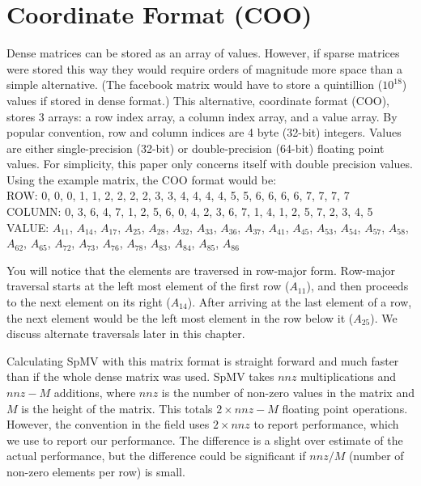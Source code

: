 \section{Coordinate Format (COO)}
\label{sec:coo}
\par Dense matrices can be stored as an array of values. However, if sparse matrices were stored this way they would require orders of magnitude more space than a simple alternative. (The facebook matrix would have to store a quintillion ($10^{18}$) values if stored in dense format.) This alternative, coordinate format (COO), stores 3 arrays: a row index array, a column index array, and a value array. By popular convention, row and column indices are 4 byte (32-bit) integers. Values are either single-precision (32-bit) or double-precision (64-bit) floating point values. For simplicity, this paper only concerns itself with double precision values. Using the example matrix, the COO format would be:\\
ROW:    0, 0, 0, 1, 1, 2, 2, 2, 2, 3, 3, 4, 4, 4, 4, 5, 5, 6, 6, 6, 6, 7, 7, 7, 7 \\ 
COLUMN: 0, 3, 6, 4, 7, 1, 2, 5, 6, 0, 4, 2, 3, 6, 7, 1, 4, 1, 2, 5, 7, 2, 3, 4, 5\\ 
VALUE: $A_{11}$, $A_{14}$, $A_{17}$, $A_{25}$, $A_{28}$, $A_{32}$, $A_{33}$, $A_{36}$, $A_{37}$, $A_{41}$, $A_{45}$, $A_{53}$, $A_{54}$, $A_{57}$, $A_{58}$, $A_{62}$, $A_{65}$, $A_{72}$, $A_{73}$, $A_{76}$, $A_{78}$, $A_{83}$, $A_{84}$, $A_{85}$, $A_{86}$ \par
You will notice that the elements are traversed in row-major form. Row-major traversal starts at the left most element of the first row ($A_{11}$), and then proceeds to the next element on its right ($A_{14}$). After arriving at the last element of a row, the next element would be the left most element in the row below it ($A_{25}$). We discuss alternate traversals later in this chapter.
\par Calculating SpMV with this matrix format is straight forward and much faster than if the whole dense matrix was used. SpMV takes $nnz$ multiplications and $nnz-M$ additions, where $nnz$ is the number of non-zero values in the matrix and $M$ is the height of the matrix. This totals $2\times nnz - M$ floating point operations. However, the convention in the field uses $2\times nnz$ to report performance, which we use to report our performance. The difference is a slight over estimate of the actual performance, but the difference could be significant if $nnz/M$ (number of non-zero elements per row) is small.
